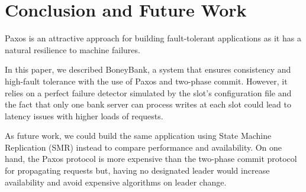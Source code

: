 \documentclass[times, 10pt,twocolumn]{article}
\begin{document}
\section{ Conclusion and Future Work }
Paxos is an attractive approach for building fault-tolerant applications as it has a natural resilience to machine failures.

In this paper, we described BoneyBank, a system that ensures consistency and high-fault tolerance with the use of Paxos and two-phase commit. However, it relies on a perfect failure detector simulated by the slot’s configuration file and the fact that only one bank server can process writes at each slot could lead to latency issues with higher loads of requests.

As future work, we could build the same application using State Machine Replication (SMR) instead to compare performance and availability. On one hand, the Paxos protocol is more expensive than the two-phase commit protocol for propagating requests but, having no designated leader would increase availability and avoid expensive algorithms on leader change.
\end{document}
